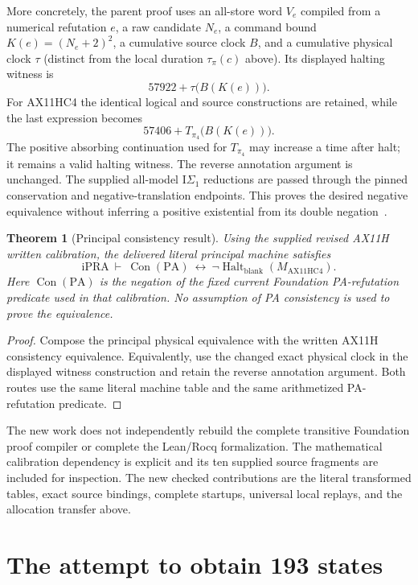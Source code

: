 \documentclass[11pt,letterpaper]{article}
\newtheorem{theorem}{Theorem}[section]
\newcommand{\ipra}{\mathrm{iPRA}}
\newcommand{\PA}{\mathrm{PA}}
\newcommand{\Con}{\operatorname{Con}}
\newcommand{\Ht}{\operatorname{Halt}}
\newcommand{\Mmain}{M_{\mathrm{AX11HC4}}}
\begin{document}
More concretely, the parent proof uses an all-store word $V_e$ compiled from a numerical refutation $e$, a raw candidate $N_e$, a command bound $K(e)=(N_e+2)^2$, a cumulative source clock $B$, and a cumulative physical clock $\tau$ (distinct from the local duration $\tau_\pi(c)$ above). Its displayed halting witness is
\[
       57922+\tau\bigl(B(K(e))\bigr).
\]
For AX11HC4 the identical logical and source constructions are retained, while the last expression becomes
\[
       \boxed{57406+T_{\pi_4}\bigl(B(K(e))\bigr).}
\]
The positive absorbing continuation used for $T_{\pi_4}$ may increase a time after halt; it remains a valid halting witness. The reverse annotation argument is unchanged. The supplied all-model $\mathrm I\Sigma_1$ reductions are passed through the pinned conservation and negative-translation endpoints. This proves the desired negative equivalence without inferring a positive existential from its double negation~\cite{ax11hfinal}.

\begin{theorem}[Principal consistency result]
Using the supplied revised AX11H written calibration, the delivered literal principal machine satisfies
\[
       \boxed{\ipra\ \vdash\
       \Con(\PA)\ \longleftrightarrow\ \neg\Ht_{\mathrm{blank}}(\Mmain).}
\]
Here $\Con(\PA)$ is the negation of the fixed current Foundation PA-refutation predicate used in that calibration. No assumption of PA consistency is used to prove the equivalence.
\end{theorem}
\begin{proof}
Compose the principal physical equivalence with the written AX11H consistency equivalence. Equivalently, use the changed exact physical clock in the displayed witness construction and retain the reverse annotation argument. Both routes use the same literal machine table and the same arithmetized PA-refutation predicate.
\end{proof}

The new work does not independently rebuild the complete transitive Foundation proof compiler or complete the Lean/Rocq formalization. The mathematical calibration dependency is explicit and its ten supplied source fragments are included for inspection. The new checked contributions are the literal transformed tables, exact source bindings, complete startups, universal local replays, and the allocation transfer above.

\section{The attempt to obtain 193 states}
\end{document}
